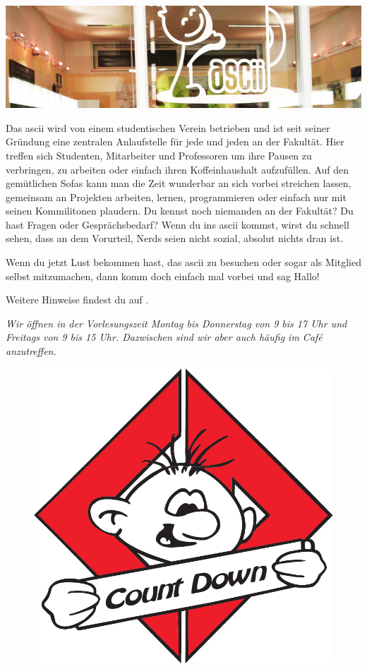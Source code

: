 \includegraphics[width=\linewidth]{img/ascii.jpg}

Das ascii wird von einem studentischen Verein betrieben und ist seit seiner Gründung eine zentralen Anlaufstelle für jede und jeden an der Fakultät.
Hier treffen sich Studenten, Mitarbeiter und Professoren um ihre Pausen zu verbringen,
zu arbeiten oder einfach ihren Koffeinhaushalt aufzufüllen.
Auf den gemütlichen Sofas kann man die Zeit wunderbar an sich vorbei streichen lassen,
gemeinsam an Projekten arbeiten, lernen, programmieren oder einfach nur mit seinen Kommilitonen plaudern.
Du kennst noch niemanden an der Fakultät?
Du hast Fragen oder Gesprächsbedarf?
Wenn du ins ascii kommst, wirst du schnell sehen, dass an dem Vorurteil, Nerds seien nicht sozial, absolut nichts dran ist.

Wenn du jetzt Lust bekommen hast, das ascii zu besuchen oder sogar als Mitglied selbst mitzumachen, dann komm doch einfach mal vorbei und sag Hallo!

Weitere Hinweise findest du auf .

\textit{Wir öffnen in der Vorlesungszeit Montag bis Donnerstag von 9 bis 17 Uhr und Freitags von 9 bis 15 Uhr. Dazwischen sind wir aber auch häufig im Café anzutreffen.}


\begin{figure}%
  \vspace{-.5cm}
  \includegraphics[width=\linewidth]{img/countdown}
  \vspace{-1cm}
\end{figure}

